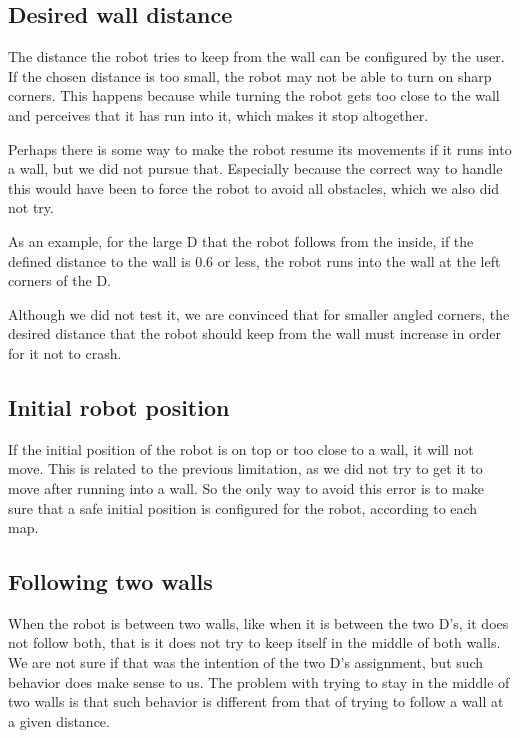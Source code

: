 \documentclass[10pt,journal,compsoc]{IEEEtran}
\begin{document}
\subsection{Desired wall distance}

The distance the robot tries to keep from the wall can be configured by the user. If the chosen distance is too small, the robot may not be able to turn on sharp corners. This happens because while turning the robot gets too close to the wall and perceives that it has run into it, which makes it stop altogether.

Perhaps there is some way to make the robot resume its movements if it runs into a wall, but we did not pursue that. Especially because the correct way to handle this would have been to force the robot to avoid all obstacles, which we also did not try.

As an example, for the large D that the robot follows from the inside, if the defined distance to the wall is 0.6 or less, the robot runs into the wall at the left corners of the D.

Although we did not test it, we are convinced that for smaller angled corners, the desired distance that the robot should keep from the wall must increase in order for it not to crash.

\subsection{Initial robot position}

If the initial position of the robot is on top or too close to a wall, it will not move. This is related to the previous limitation, as we did not try to get it to move after running into a wall. So the only way to avoid this error is to make sure that a safe initial position is configured for the robot, according to each map.

\subsection{Following two walls}

When the robot is between two walls, like when it is between the two D's, it does not follow both, that is it does not try to keep itself in the middle of both walls. We are not sure if that was the intention of the two D's assignment, but such behavior does make sense to us. The problem with trying to stay in the middle of two walls is that such behavior is different from that of trying to follow a wall at a given distance. 
\end{document}

